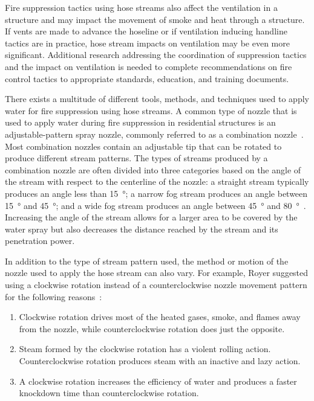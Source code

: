 \documentclass[12pt,oneside]{book}
\begin{document}
Fire suppression tactics using hose streams also affect the ventilation in a structure and may impact the movement of smoke and heat through a structure. If vents are made to advance the hoseline or if ventilation inducing handline tactics are in practice, hose stream impacts on ventilation may be even more significant. Additional research addressing the coordination of suppression tactics and the impact on ventilation is needed to complete recommendations on fire control tactics to appropriate standards, education, and training documents.

There exists a multitude of different tools, methods, and techniques used to apply water for fire suppression using hose streams. A common type of nozzle that is used to apply water during fire suppression in residential structures is an adjustable-pattern spray nozzle, commonly referred to as a combination nozzle~\cite{NFPA_1964}. Most combination nozzles contain an adjustable tip that can be rotated to produce different stream patterns. The types of streams produced by a combination nozzle are often divided into three categories based on the angle of the stream with respect to the centerline of the nozzle: a straight stream typically produces an angle less than 15\SI{}{\degree}; a narrow fog stream produces an angle between 15\SI{}{\degree} and 45\SI{}{\degree}; and a wide fog stream produces an angle between 45\SI{}{\degree} and 80\SI{}{\degree}~\cite{IFSTA:Essentials_of_FF}. Increasing the angle of the stream allows for a larger area to be covered by the water spray but also decreases the distance reached by the stream and its penetration power. 

In addition to the type of stream pattern used, the method or motion of the nozzle used to apply the hose stream can also vary. For example, Royer suggested using a clockwise rotation instead of a counterclockwise nozzle movement pattern for the following reasons~\cite{Royer:ISU}:
\begin{enumerate} 
	\item Clockwise rotation drives most of the heated gases, smoke, and flames away from the nozzle, while counterclockwise rotation does just the opposite.
	\item Steam formed by the clockwise rotation has a violent rolling action. Counterclockwise rotation produces steam with an inactive and lazy action.
	\item A clockwise rotation increases the efficiency of water and produces a faster knockdown time than counterclockwise rotation.
\end{enumerate}
\end{document}
